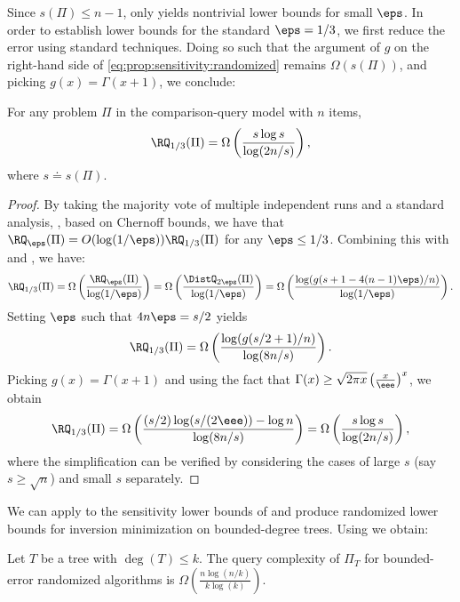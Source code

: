 \documentclass{toc}
\begin{document}
Since $s(\Pi) \le n-1$,  only yields nontrivial lower bounds for small $\eps$. In order to establish lower bounds for the standard $\eps=1/3$, we first reduce the error using standard techniques. Doing so such that the argument of $g$ on the right-hand side of \eqref{eq:prop:sensitivity:randomized} remains $\Omega(s(\Pi))$, and picking $g(x)=\Gamma(x+1)$, we conclude:

\begin{lemma}
\label{lemma:randomized-sensitivity}
For any problem $\Pi$ in the comparison-query model with $n$ items, 
\[\RQ_{1/3}(\Pi) = \Omega \left(\frac{s \log s}{\log(2n/s)} \right), \]
where $s \doteq s(\Pi)$.
\end{lemma}

\begin{proof}
By taking the majority vote of multiple independent runs and a standard analysis, \eg, based on Chernoff bounds, we have that $\RQ_\eps(\Pi) = O(\log(1/\eps)) \RQ_{1/3}(\Pi)$ for any $\eps \le 1/3$. Combining this with  and , we have:
\[\RQ_{1/3}(\Pi) = \Omega \left( \frac{\RQ_{\eps}(\Pi)}{\log(1/\eps)} \right) = \Omega \left(  \frac{\DistQ_{2\eps}(\Pi)}{\log(1/\eps)} \right) =  \Omega \left( \frac{\log(g(s+1-4(n-1)\eps)/n)}{\log(1/\eps)}\right). \]
Setting $\eps$ such that $4n\eps = s/2$ yields
\[\RQ_{1/3}(\Pi) =  \Omega \left( \frac{\log(g(s/2+1)/n)}{\log(8n/s)}\right).
\]
Picking $g(x)=\Gamma(x+1)$ and using the fact that $\Gamma(x) \ge \sqrt{2\pi x} \left(\frac{x}{\eee}\right)^x$, %
we obtain
\[\RQ_{1/3}(\Pi) =  \Omega \left( \frac{(s/2)\log(s/(2\eee)) - \log n}{\log(8n/s)}\right) = \Omega \left( \frac{s\log s }{\log(2n/s)}\right),
\]
where the simplification can be verified by considering the cases of large $s$ (say $s \ge \sqrt{n}$) and small $s$ separately. 
\end{proof}

We can apply  to the sensitivity lower bounds of  and produce randomized lower bounds for inversion minimization on bounded-degree trees. Using  we obtain: 

\begin{theorem}
	Let $T$ be a tree with $\deg(T)\le k$. The query complexity of $\Pi_T$ for bounded-error randomized algorithms is $\Omega(\frac{n\log(n/k)}{k\log(k)})$.
\end{theorem}
\end{document}
